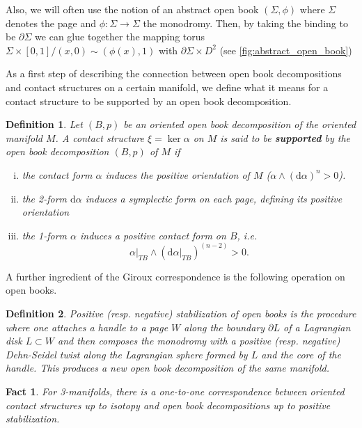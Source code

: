 \documentclass[a4paper]{amsart}
\newtheorem{definition}{Definition}
\newtheorem{fact}{Fact}
\renewcommand*{\d}{\mathrm{d}}
\begin{document}
Also, we will often use the notion of an abstract open book $(\Sigma, \phi)$
where $\Sigma$ denotes the page and $\phi: \Sigma \to \Sigma$ the monodromy.
Then, by taking the binding to be $\partial \Sigma$ we can glue together the 
mapping torus $\Sigma \times [0,1] / (x, 0) \sim (\phi(x), 1)$
with $\partial \Sigma \times D^2$ (see \cref{fig:abstract_open_book})

As a first step of describing the connection between open book decompositions and 
contact structures on a certain manifold, we define what it means for a contact structure to be
supported by an open book decomposition.
\begin{definition}\label{def:support}\cite{Geiges08}
    Let $(B,p)$ be an oriented open book decomposition of the oriented manifold $M$.
    A contact structure $\xi = \ker \alpha$ on $M$ is said to be \textbf{supported} by the open book decomposition $(B,p)$ of $M$ if
    \begin{enumerate}[(i)]
        \item the contact form $\alpha$ induces the positive orientation of $M$ ($\alpha \wedge (\d \alpha)^n > 0$).
        \item the 2-form $\d \alpha$ induces a symplectic form on each page, defining its positive orientation
        \item the 1-form $\alpha$ induces a positive contact form on $B$, i.e. 
        \[ 
            \alpha|_{TB} \wedge (\d \alpha|_{TB})^{(n-2)} > 0.
        \]
    \end{enumerate}
\end{definition}

A further ingredient of the Giroux correspondence is the following operation on open books.
\begin{definition}\cite{Koert17}
    Positive (resp. negative) \textit{stabilization of open books} is the procedure where
    one attaches a handle to a page $W$ along the boundary $\partial L$ of a Lagrangian disk $L\subset W$ and then composes the monodromy with
    a positive (resp. negative) Dehn-Seidel twist along the Lagrangian sphere formed by $L$ 
    and the core of the handle.
    This produces a new open book decomposition of the same manifold.
\end{definition}

\begin{fact}\cite{Giroux02}
For 3-manifolds, there is a one-to-one correspondence between oriented contact structures up to isotopy
and open book decompositions up to positive stabilization.
\end{fact}
\end{document}
